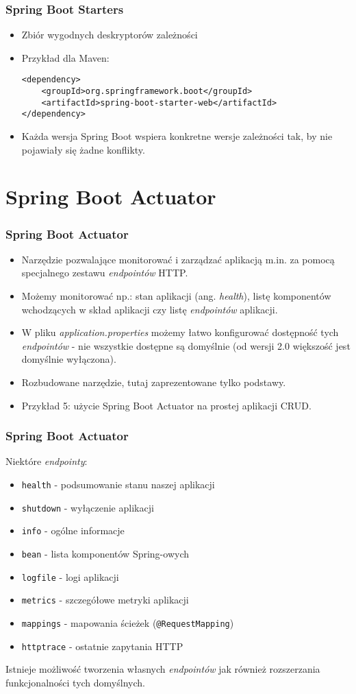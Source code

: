 \documentclass{beamer}
\begin{document}
\begin{frame}[fragile]
\frametitle{Spring Boot Starters}
\begin{itemize}
\item Zbiór wygodnych deskryptorów zależności
\item Przykład dla Maven:
\begin{lstlisting}
<dependency>
    <groupId>org.springframework.boot</groupId>
    <artifactId>spring-boot-starter-web</artifactId>
</dependency>
\end{lstlisting}
\item Każda wersja Spring Boot wspiera konkretne wersje zależności tak, by nie pojawiały się żadne konflikty.
\end{itemize}
\end{frame}


\section{Spring Boot Actuator}

\begin{frame}
\frametitle{Spring Boot Actuator}
\begin{itemize}
\item Narzędzie pozwalające monitorować i zarządzać aplikacją m.in. za pomocą specjalnego zestawu \textit{endpointów} HTTP.
\item Możemy monitorować np.: stan aplikacji (ang. \textit{health}), listę komponentów wchodzących w skład aplikacji czy listę \textit{endpointów} aplikacji.
\item W pliku \textit{application.properties} możemy łatwo konfigurować dostępność tych \textit{endpointów} - nie wszystkie dostępne są domyślnie (od wersji 2.0 większość jest domyślnie wyłączona).
\item Rozbudowane narzędzie, tutaj zaprezentowane tylko podstawy.
\item Przykład 5: użycie Spring Boot Actuator na prostej aplikacji CRUD.
\end{itemize}
\end{frame}

\begin{frame}
\frametitle{Spring Boot Actuator}
Niektóre \textit{endpointy}:
\begin{itemize}
\item \lstinline{health} - podsumowanie stanu naszej aplikacji
\item \lstinline{shutdown} - wyłączenie aplikacji
\item \lstinline{info} - ogólne informacje
\item \lstinline{bean} - lista komponentów Spring-owych
\item \lstinline{logfile} - logi aplikacji
\item \lstinline{metrics} - szczegółowe metryki aplikacji
\item \lstinline{mappings} - mapowania ścieżek (\lstinline{@RequestMapping})
\item \lstinline{httptrace} - ostatnie zapytania HTTP
\end{itemize}
Istnieje możliwość tworzenia własnych \textit{endpointów} jak również rozszerzania funkcjonalności tych domyślnych.
\end{frame}
\end{document}
